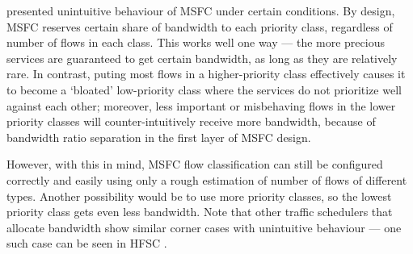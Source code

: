  presented unintuitive behaviour of MSFC under certain conditions. By design, MSFC reserves certain share of bandwidth to each priority class, regardless of number of flows in each class. This works well one way --- the more precious services are guaranteed to get certain bandwidth, as long as they are relatively rare. In contrast, puting most flows in a higher-priority class effectively causes it to become a `bloated' low-priority class where the services do not prioritize well against each other; moreover, less important or misbehaving flows in the lower priority classes will counter-intuitively receive more bandwidth, because of bandwidth ratio separation in the first layer of MSFC design.

However, with this in mind, MSFC flow classification can still be configured correctly and easily using only a rough estimation of number of flows of different types. Another possibility would be to use more priority classes, so the lowest priority class gets even less bandwidth. Note that other traffic schedulers that allocate bandwidth show similar corner cases with unintuitive behaviour --- one such case can be seen in HFSC \cite[Corner cases section]{hfscMan}.











